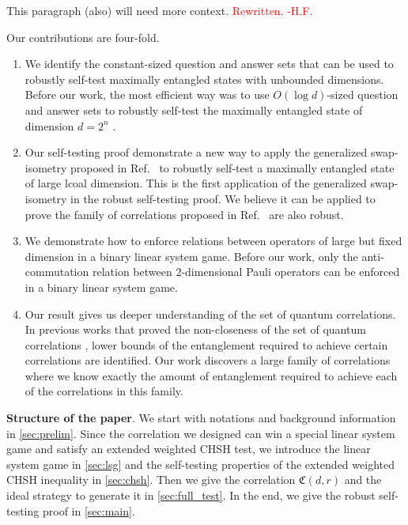 \documentclass[11pt,letterpaper]{article}
\newcommand{\1}{\mathbb{1}}
\newcommand{\fC}{\mathfrak{C}}
\def\carl#1{{\color{blue} #1}}
\newcommand{\hfc}[1]{\textcolor{red}{#1 -H.F.}}
\theoremstyle{definition}
\begin{document}
\carl{This paragraph (also) will need more context.}
\hfc{Rewritten.}

Our contributions are four-fold.
\begin{enumerate}
    \item We identify the constant-sized question and answer sets that can be used to robustly self-test
    maximally entangled states with unbounded dimensions. Before our work, the most efficient way
    was to use $O(\log d)$-sized question and answer sets to robustly self-test
    the maximally entangled state of dimension $d = 2^n$ \cite{lowdegree}.
    \item Our self-testing proof demonstrate a new way to apply the generalized swap-isometry
    proposed in Ref.~\cite{yang2013} to robustly self-test a maximally entangled state of large lcoal
    dimension. This is the first application of the generalized swap-isometry in the robust self-testing proof.
    We believe it can be applied to prove the family of correlations proposed in Ref.~\cite{coladan2017all}
    are also robust.
    \item We demonstrate how to enforce relations between operators of large but fixed dimension in a 
    binary linear system game. Before our work, only the anti-commutation relation between $2$-dimensional
    Pauli operators can be enforced in a binary linear system game.
    \item Our result gives us deeper understanding of the set of quantum correlations.
    In previous works that proved the non-closeness of the set of quantum correlations
    \cite{slofstra2017}, 
    lower bounds of the entanglement required to achieve certain correlations are identified.
    Our work discovers a large family of correlations where we know exactly the amount of entanglement
    required to achieve each of the correlations in this family. 
\end{enumerate}

\textbf{Structure of the paper}.
We start with notations and background information in \cref{sec:prelim}.
Since the correlation we designed can win a special linear system game and satisfy
an extended weighted CHSH test, we introduce the linear system game
in \cref{sec:lsg} and the self-testing properties of the extended weighted CHSH inequality in \cref{sec:chsh}. 
Then we give the correlation $\fC(d,r)$ and the ideal strategy to generate it in \cref{sec:full_test}.
In the end, we give the robust self-testing proof in \cref{sec:main}. 

\end{document}
